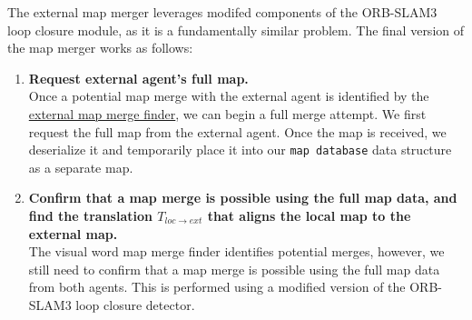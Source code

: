 
The external map merger leverages modifed components of the ORB-SLAM3 loop closure module, as it is a fundamentally similar problem. The final version of the map merger works as follows:

\begin{enumerate}
    \item \textbf{Request external agent's full map.} \\
          Once a potential map merge with the external agent is identified by the \hyperref[sec:external-map-merge-finder]{external map merge finder}, we can begin a full merge attempt. We first request the full map from the external agent. Once the map is received, we deserialize it and temporarily place it into our \texttt{map database} data structure as a separate map.
    \item \textbf{Confirm that a map merge is possible using the full map data, and find the translation $T_{loc \rightarrow ext}$ that aligns the local map to the external map.} \\
          The visual word map merge finder identifies potential merges, however, we still need to confirm that a map merge is possible using the full map data from both agents. This is performed using a modified version of the ORB-SLAM3 loop closure detector.


\end{enumerate}
